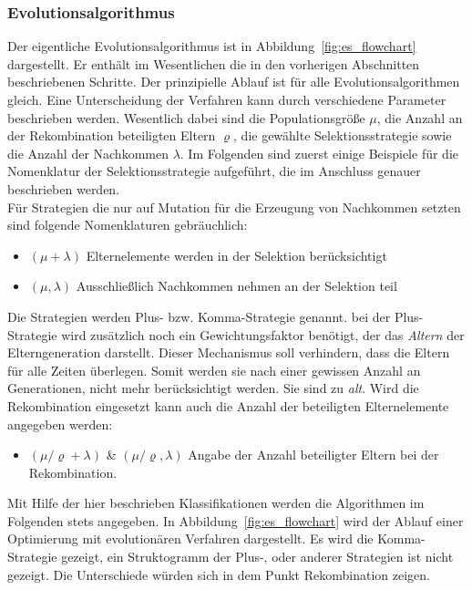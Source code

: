 \subsubsection{Evolutionsalgorithmus}
%
Der eigentliche Evolutionsalgorithmus ist in Abbildung~\ref{fig:es_flowchart} dargestellt. Er enthält im Wesentlichen die in den vorherigen Abschnitten beschriebenen Schritte. Der prinzipielle Ablauf ist für alle Evolutionsalgorithmen gleich. Eine Unterscheidung der Verfahren kann durch verschiedene Parameter beschrieben werden. Wesentlich dabei sind die Populationsgröße $\mu$, die Anzahl an der Rekombination beteiligten Eltern $\varrho$, die gewählte Selektionsstrategie sowie die Anzahl der Nachkommen $\lambda$. Im Folgenden sind zuerst einige Beispiele für die Nomenklatur der Selektionsstrategie aufgeführt, die im Anschluss genauer beschrieben werden.\\
Für Strategien die nur auf Mutation für die Erzeugung von Nachkommen setzten sind folgende Nomenklaturen gebräuchlich:
\begin{itemize}
\item $(\mu+\lambda)$ Elternelemente werden in der Selektion berücksichtigt
\item $(\mu,\lambda)$ Ausschließlich Nachkommen nehmen an der Selektion teil
\end{itemize}
%
Die Strategien werden Plus- bzw. Komma-Strategie genannt. bei der Plus-Strategie wird zusätzlich noch ein Gewichtungsfaktor benötigt, der das \textit{Altern} der Elterngeneration darstellt. Dieser Mechanismus soll verhindern, dass die Eltern für alle Zeiten überlegen. Somit werden sie nach einer gewissen Anzahl an Generationen, nicht mehr berücksichtigt werden. Sie sind zu \textit{alt}. Wird die Rekombination eingesetzt kann auch die Anzahl der beteiligten Elternelemente angegeben werden:
%
\begin{itemize}
\item $({\mu}/{\varrho}+\lambda)$ \& $({\mu}/{\varrho},\lambda)$ Angabe der Anzahl beteiligter Eltern bei der Rekombination.
\end{itemize}
%
Mit Hilfe der hier beschrieben Klassifikationen werden die Algorithmen im Folgenden stets angegeben. In Abbildung~\ref{fig:es_flowchart} wird der Ablauf einer Optimierung mit evolutionären Verfahren dargestellt. Es wird die Komma-Strategie gezeigt, ein Struktogramm der Plus-, oder anderer Strategien ist nicht gezeigt. Die Unterschiede würden sich in dem Punkt Rekombination zeigen.
%
